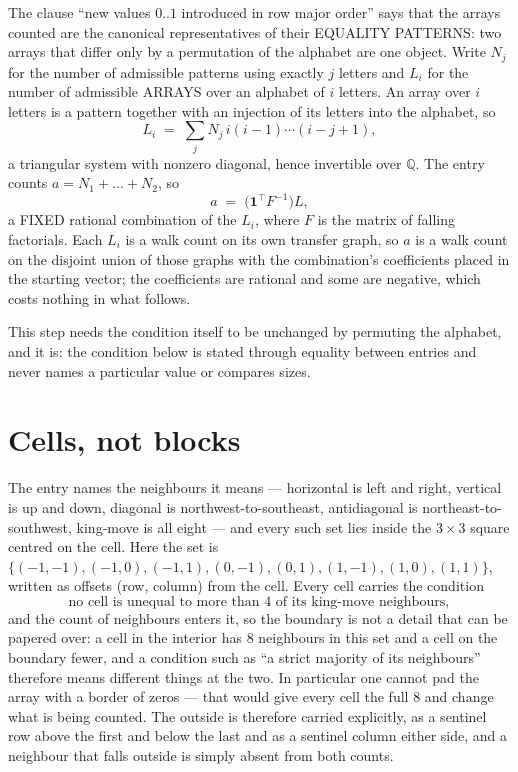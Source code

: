 \documentclass[11pt,a4paper]{article}
\theoremstyle{plain}
\theoremstyle{definition}
\begin{document}
The clause ``new values $0..1$ introduced in row major order'' says that the arrays
counted are the canonical representatives of their EQUALITY PATTERNS: two arrays that differ
only by a permutation of the alphabet are one object. Write $N_j$ for the number of admissible
patterns using exactly $j$ letters and $L_i$ for the number of admissible ARRAYS over an
alphabet of $i$ letters. An array over $i$ letters is a pattern together with an injection of
its letters into the alphabet, so
\[
L_i\;=\;\sum_{j}N_j\,i(i-1)\cdots(i-j+1),
\]
a triangular system with nonzero diagonal, hence invertible over $\mathbb{Q}$. The entry
counts $a=N_1+\dots+N_{2}$, so
\[
a\;=\;\bigl(\mathbf{1}^{\!\top}F^{-1}\bigr)L ,
\]
a FIXED rational combination of the $L_i$, where $F$ is the matrix of falling factorials.
Each $L_i$ is a walk count on its own transfer graph, so $a$ is a walk count on the disjoint
union of those graphs with the combination's coefficients placed in the starting vector; the
coefficients are rational and some are negative, which costs nothing in what follows.

This step needs the condition itself to be unchanged by permuting the alphabet, and it is:
the condition below is stated through equality between entries and never names a particular
value or compares sizes.

\section{Cells, not blocks}

The entry names the neighbours it means --- horizontal is left and right, vertical is up and
down, diagonal is northwest-to-southeast, antidiagonal is northeast-to-southwest, king-move is
all eight --- and every such set lies inside the $3\times3$ square centred on the cell. Here
the set is $\{(-1,-1), (-1,0), (-1,1), (0,-1), (0,1), (1,-1), (1,0), (1,1)\}$, written as offsets (row, column) from the cell. Every cell carries
the condition
\[
\text{no cell is unequal to more than 4 of its king-move neighbours},
\]
and the count of neighbours enters it, so the boundary is not a detail that can be papered
over: a cell in the interior has $8$ neighbours in this set and a cell on the boundary
fewer, and a condition such as ``a strict majority of its neighbours'' therefore means
different things at the two. In particular one cannot pad the array with a border of zeros ---
that would give every cell the full $8$ and change what is being counted. The outside is
therefore carried
explicitly, as a sentinel row above the first and below the last and as a sentinel column
either side, and a neighbour that falls outside is simply absent from both counts.
\end{document}
